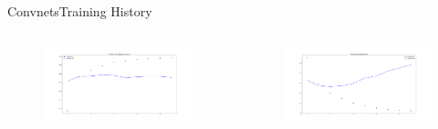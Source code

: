 \documentclass{beamer}
\begin{document}
\iffalse
\begin{frame}{Convnets}{Training History}

  \begin{columns}
    \begin{column}{0.5\textwidth}
      \begin{figure}[ht]
        \centering
        \includegraphics[width=1.2\textwidth]{convnet_training}
      \end{figure}

    \end{column}
    \begin{column}{0.5\textwidth}
      \begin{figure}[ht]
        \centering
        \includegraphics[width=1.2\textwidth]{convnet_loss}
      \end{figure}

    \end{column}
  \end{columns}

\end{frame}
\end{document}
